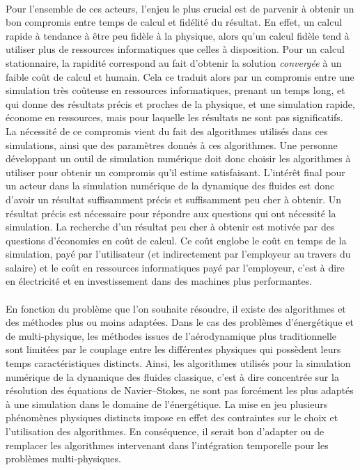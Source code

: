     \paragraph{}
    Pour l'ensemble de ces acteurs, l'enjeu le plus crucial est de parvenir à obtenir un bon compromis entre temps de calcul et fidélité du résultat.
    En effet, un calcul rapide à tendance à être peu fidèle à la physique, alors qu'un calcul fidèle tend à utiliser plus de ressources informatiques que celles à disposition.
    Pour un calcul stationnaire, la rapidité correspond au fait d'obtenir la solution \emph{convergée} à un faible coût de calcul et humain.
    Cela ce traduit alors par un compromis entre une simulation très coûteuse en ressources informatiques, prenant un temps long, et qui donne des résultats précis et proches de la physique, et une simulation rapide, économe en ressources, mais pour laquelle les résultats ne sont pas significatifs.
    La nécessité de ce compromis vient du fait des algorithmes utilisés dans ces simulations, ainsi que des paramètres donnés à ces algorithmes.
    Une personne développant un outil de simulation numérique doit donc choisir les algorithmes à utiliser pour obtenir un compromis qu'il estime satisfaisant.
    L'intérêt final pour un acteur dans la simulation numérique de la dynamique des fluides est donc d'avoir un résultat suffisamment précis et suffisamment peu cher à obtenir.
    Un résultat précis est nécessaire pour répondre aux questions qui ont nécessité la simulation.
    La recherche d'un résultat peu cher à obtenir est motivée par des questions d'économies en coût de calcul.
    Ce coût englobe le coût en temps de la simulation, payé par l'utilisateur (et indirectement par l'employeur au travers du salaire) et le coût en ressources informatiques payé par l'employeur, c'est à dire en électricité et en investissement dans des machines plus performantes.

    \paragraph{}
    En fonction du problème que l'on souhaite résoudre, il existe des algorithmes et des méthodes plus ou moins adaptées.
    Dans le cas des problèmes d'énergétique et de multi-physique, les méthodes issues de l'aérodynamique plus traditionnelle sont limitées par le couplage entre les différentes physiques qui possèdent leurs temps caractéristiques distincts.
    Ainsi, les algorithmes utilisés pour la simulation numérique de la dynamique des fluides classique, c'est à dire concentrée sur la résolution des équations de Navier--Stokes, ne sont pas forcément les plus adaptés à une simulation dans le domaine de l'énergétique.
    La mise en jeu plusieurs phénomènes physiques distincts impose en effet des contraintes sur le choix et l'utilisation des algorithmes.
    En conséquence, il serait bon d'adapter ou de remplacer les algorithmes intervenant dans l'intégration temporelle pour les problèmes multi-physiques.



